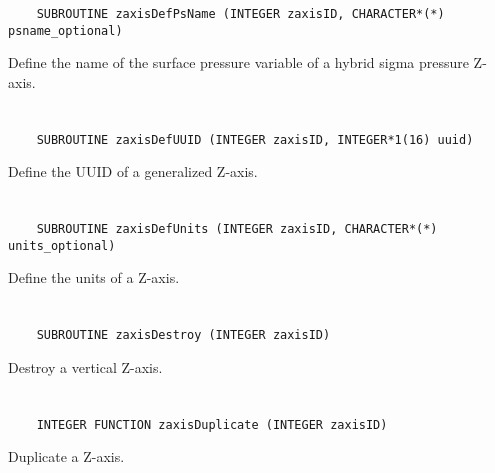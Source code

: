 \begin{verbatim}
    SUBROUTINE zaxisDefPsName (INTEGER zaxisID, CHARACTER*(*) psname_optional)
\end{verbatim}

Define the name of the surface pressure variable of a hybrid sigma pressure Z-axis.


\section*{\tt {}}

\begin{verbatim}
    SUBROUTINE zaxisDefUUID (INTEGER zaxisID, INTEGER*1(16) uuid)
\end{verbatim}

Define the UUID of a generalized Z-axis.


\section*{\tt {}}

\begin{verbatim}
    SUBROUTINE zaxisDefUnits (INTEGER zaxisID, CHARACTER*(*) units_optional)
\end{verbatim}

Define the units of a Z-axis.


\section*{\tt {}}

\begin{verbatim}
    SUBROUTINE zaxisDestroy (INTEGER zaxisID)
\end{verbatim}

Destroy a vertical Z-axis.


\section*{\tt {}}

\begin{verbatim}
    INTEGER FUNCTION zaxisDuplicate (INTEGER zaxisID)
\end{verbatim}

Duplicate a Z-axis.


\section*{\tt {}}


